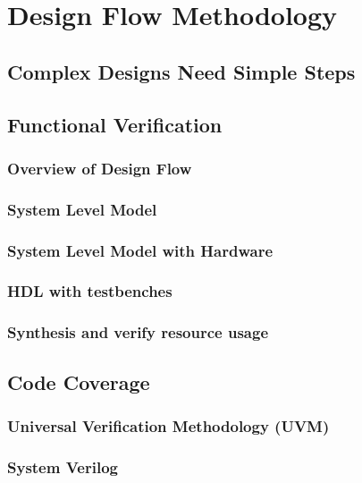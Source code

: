 \chapter{Design Flow Methodology}

\section{Complex Designs Need Simple Steps}

\section{Functional Verification}
\subsection{Overview of Design Flow}
\subsection{System Level Model}
\subsection{System Level Model with Hardware}
\subsection{HDL with testbenches}
\subsection{Synthesis and verify resource usage}

\section{Code Coverage}
\subsection{Universal Verification Methodology (UVM)}
\subsection{System Verilog}